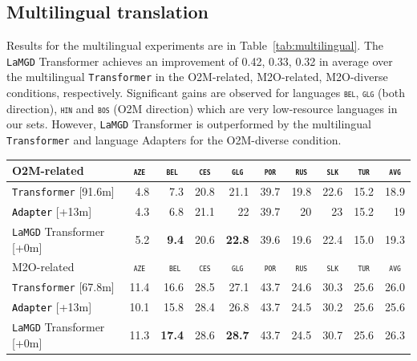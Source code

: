 \documentclass[11pt]{article}
\newcommand{\revision}[1]{\textcolor{black}{#1}}
\newcommand{\domain}[1]{\texttt{\textsc{#1}}}
\newcommand{\system}[1]{\texttt{{#1}}}
\newcommand{\SB}[1]{\textbf{#1}}
\begin{document}
\subsection{Multilingual translation}
Results for the multilingual experiments are in Table~\ref{tab:multilingual}.  The \system{LaMGD} Transformer achieves an improvement of 0.42, 0.33, 0.32 in average over the multilingual \system{Transformer} in the O2M-related, M2O-related, M2O-diverse conditions, respectively. Significant gains are observed for languages \domain{bel}, \domain{glg} (both direction), \domain{hin} and \domain{bos} (O2M direction) which are very low-resource languages in our sets. However, \system{LaMGD} Transformer is outperformed by the multilingual \system{Transformer} and language Adapters for the O2M-diverse condition.
\begin{table}[h!]
  \centering
  \begin{tabular}{|p{4cm}|*{9}{r|}} \hline
    O2M-related & \multicolumn{1}{c|}{\domain{aze}} & \multicolumn{1}{c|}{\domain{bel}} & \multicolumn{1}{c|}{\domain{ces}} & \multicolumn{1}{c|}{\domain{glg}} & \multicolumn{1}{c|}{\domain{por}} & \multicolumn{1}{c|}{\domain{rus}} & \multicolumn{1}{c|}{\domain{slk}} & \multicolumn{1}{c|}{\domain{tur}} & \multicolumn{1}{c|}{\domain{avg}} \\ \hline 
    \system{Transformer}  \hfill{\footnotesize[91.6m]} & 4.8 &7.3&20.8&21.1&39.7&19.8&22.6&15.2&18.9 \\
    \revision{\system{Adapter}}   \hfill{\footnotesize[+13m]} &4.3&6.8&21.1&22&39.7&20&23&15.2&19 \\ 
    \system{LaMGD} Transformer  \hfill{\footnotesize[+0m]}  & 5.2&\SB{9.4}&20.6&\SB{22.8}&39.6&19.6&22.4&15.0&19.3 \\ 
	\hline
    \hline
    M2O-related & \multicolumn{1}{c|}{\domain{aze}} & \multicolumn{1}{c|}{\domain{ bel}} & \multicolumn{1}{c|}{\domain{ces}} & \multicolumn{1}{c|}{\domain{glg}} & \multicolumn{1}{c|}{\domain{por}} & \multicolumn{1}{c|}{\domain{rus}} & \multicolumn{1}{c|}{\domain{slk}} & \multicolumn{1}{c|}{\domain{tur}} & \multicolumn{1}{c|}{\domain{avg}} \\ \hline 
    \system{Transformer}  \hfill{\footnotesize[67.8m]} &11.4&16.6&28.5&	27.1&43.7&24.6&30.3&25.6&26.0 \\
    \revision{\system{Adapter}}   \hfill{\footnotesize[+13m]} &10.1&15.8&28.4&26.8&43.7&24.5&30.2&25.6&25.6\\ 
    \system{LaMGD} Transformer   \hfill{\footnotesize[+0m]}  &11.3&\SB{17.4}&28.6&\SB{28.7}&43.7&24.5&30.7&25.6&26.3 \\ 

\end{tabular}
\end{table}
\end{document}
